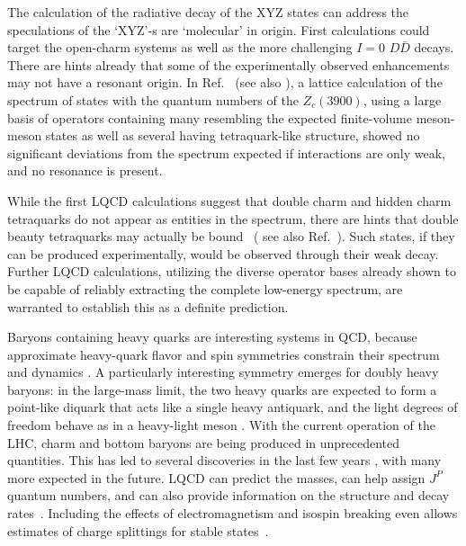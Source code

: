 
The calculation of the radiative decay of the XYZ states can address the speculations of the `XYZ'-s are `molecular' in origin. First calculations could target the open-charm systems as well as the more challenging $I=0$ $D\bar{D}$ decays.
%
There are hints already that some of the experimentally observed enhancements may not have a resonant origin. In Ref.~\cite{Cheung:2017tnt} (see also \cite{Prelovsek:2014swa}), a lattice calculation of the spectrum of states with the quantum numbers of the $Z_c(3900)$, using a large basis of operators containing many resembling the expected finite-volume meson-meson states as well as several having tetraquark-like structure, showed no significant deviations from the spectrum expected if interactions are only weak, and no resonance is present. 

While the first LQCD calculations suggest that double charm and hidden charm tetraquarks do not appear as entities in the spectrum, there are hints that double beauty tetraquarks may actually be {bound}~\cite{Francis:2016hui} ( see also Ref.~\cite{Hughes:2017xie}). Such states, if they can be produced experimentally, would be observed through their weak decay. Further LQCD calculations, utilizing the diverse operator bases already shown to be capable of  reliably extracting the complete low-energy spectrum, are warranted to establish this as a definite prediction. 

 Baryons containing heavy quarks are interesting systems in QCD, because approximate heavy-quark flavor and spin symmetries
constrain their spectrum and dynamics \cite{Korner:1994nh, Manohar:2000dt}. A particularly interesting symmetry emerges for doubly heavy baryons: in the large-mass limit, the two heavy quarks
are expected to form a point-like diquark that acts like a single heavy antiquark, and the light degrees of freedom behave as in a
heavy-light meson \cite{Savage:1990di, Brambilla:2005yk}. With the current operation of the LHC, charm and bottom baryons are being produced in unprecedented quantities.
This has led to several discoveries in the last few years \cite{Chatrchyan:2012ni, Aaij:2012da, Aaij:2014yka, Aaij:2016jnn, Aaij:2017ueg,  Aaij:2017vbw, Aaij:2017nav}, with many more expected in the future. LQCD
can predict the masses, can help assign $J^P$ quantum numbers, and can also provide information on the structure and decay rates~\cite{Brown:2014ena, Padmanath:2015jea, Bali:2015lka, Alexandrou:2017xwd}. Including the effects of electromagnetism and isospin breaking even allows estimates of charge splittings for stable states~\cite{Borsanyi:2014jba}.



